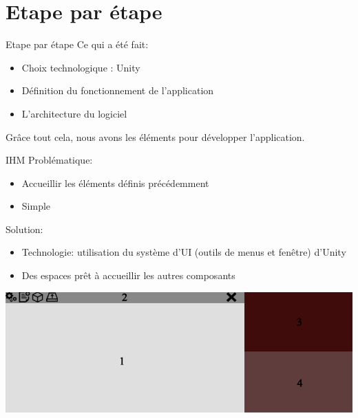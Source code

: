 \documentclass[a4paper,10pt]{beamer}
\begin{document}
			
	\section{Etape par étape}
			\begin{frame}{Etape par étape}
				Ce qui a été fait:
					\begin{itemize}
						\item Choix technologique : Unity
						\item Définition du fonctionnement de l'application
						\item L'architecture du logiciel
					\end{itemize}
				Grâce tout cela, nous avons les éléments pour développer l'application.
			\end{frame}
		
		
	\begin{frame}{IHM}
			Problématique:
				\begin{itemize}
					\item Accueillir les éléments définis précédemment
					\item Simple
				\end{itemize}
				
			Solution:
				\begin{itemize}
					\item Technologie: utilisation du système d'UI (outils de menus et fenêtre) d'Unity
					\item Des espaces prêt à accueillir les autres composants
				\end{itemize}
				\centerline{\includegraphics[scale=0.3]{images/Nono/img6.png}} 
	\end{frame}
	
\end{document}
